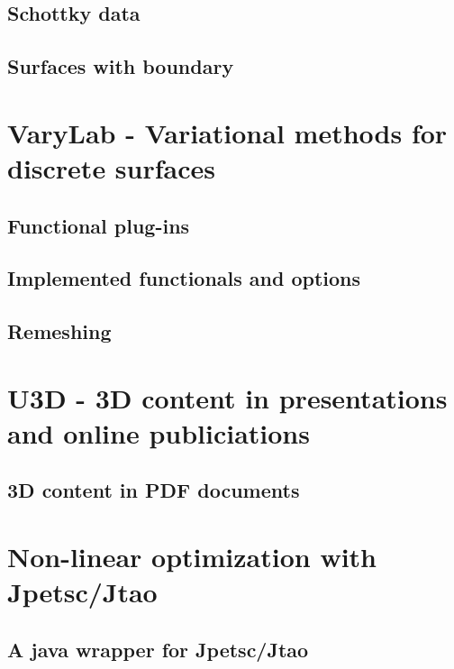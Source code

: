 \subsection{Schottky data}
\subsection{Surfaces with boundary}

\section{{\sc VaryLab} - Variational methods for discrete surfaces}
\label{sec:varylab}
\subsection{Functional plug-ins}
\subsection{Implemented functionals and options}
\subsection{Remeshing}

\section{{\sc U3D} - 3D content in presentations and online publiciations}
\label{sec:u3d}
\subsection{3D content in PDF documents}

\section{Non-linear optimization with {\sc Jpetsc/Jtao}}
\label{sec:jpetsctao}
\subsection{A java wrapper for {\sc Jpetsc/Jtao}}

